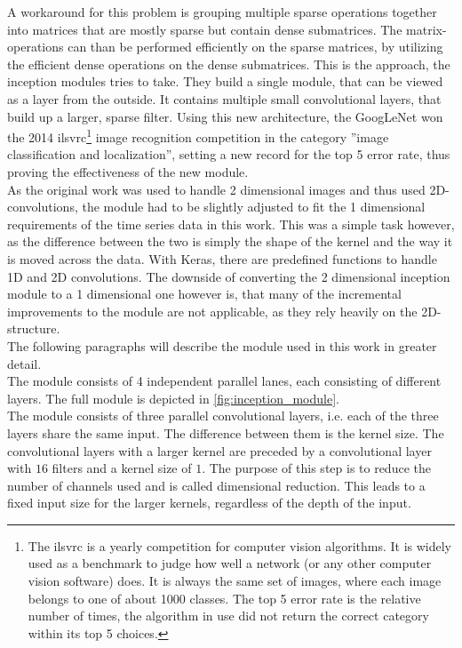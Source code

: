 A workaround for this problem is grouping multiple sparse operations together into matrices that are mostly sparse but contain dense submatrices. The matrix-operations can than be performed efficiently on the sparse matrices, by utilizing the efficient dense operations on the dense submatrices. This is the approach, the inception modules tries to take. They build a single module, that can be viewed as a layer from the outside. It contains multiple small convolutional layers, that build up a larger, sparse filter. Using this new architecture, the GoogLeNet won the 2014 \gls{ilsvrc}\footnote{The \gls{ilsvrc} is a yearly competition for computer vision algorithms. It is widely used as a benchmark to judge how well a network (or any other computer vision software) does. It is always the same set of images, where each image belongs to one of about 1000 classes. The top 5 error rate is the relative number of times, the algorithm in use did not return the correct category within its top 5 choices.} image recognition competition in the category ''image classification and localization'', setting a new record for the top 5 error rate, thus proving the effectiveness of the new module. \cite{inception_module, ILSVRC15}\\
As the original work was used to handle 2 dimensional images and thus used 2D-convolutions, the module had to be slightly adjusted to fit the 1 dimensional requirements of the time series data in this work. This was a simple task however, as the difference between the two is simply the shape of the kernel and the way it is moved across the data. With Keras, there are predefined functions to handle 1D and 2D convolutions. The downside of converting the 2 dimensional inception module to a 1 dimensional one however is, that many of the incremental improvements to the module are not applicable, as they rely heavily on the 2D-structure. \cite{inception_v2_v3, inception_v4}\medskip\\
The following paragraphs will describe the module used in this work in greater detail.\\
The module consists of 4 independent parallel lanes, each consisting of different layers. The full module is depicted in \autoref{fig:inception_module}.\\
The module consists of three parallel convolutional layers, i.e. each of the three layers share the same input. The difference between them is the kernel size. The convolutional layers with a larger kernel are preceded by a convolutional layer with $16$ filters and a kernel size of $1$. The purpose of this step is to reduce the number of channels used and is called dimensional reduction. This leads to a fixed input size for the larger kernels, regardless of the depth of the input. 
